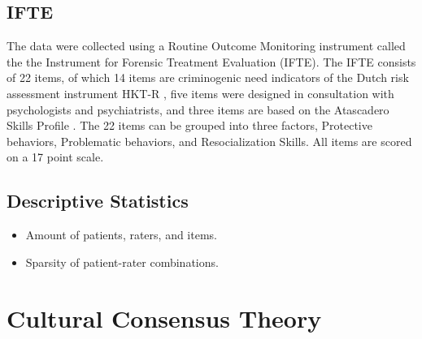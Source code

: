 \documentclass[a4paper,11pt]{article}
\begin{document}
\subsection{IFTE}

The data were collected using a Routine Outcome Monitoring instrument called the the Instrument for Forensic Treatment Evaluation (IFTE).
The IFTE consists of 22 items, of which 14 items are criminogenic need indicators of the Dutch risk assessment instrument HKT-R \parencite{spreen2013handleiding}, five items were designed in consultation with psychologists and psychiatrists, and three items are based on the Atascadero Skills Profile \parencite{vess2001development}.
The 22 items can be grouped into three factors, Protective behaviors, Problematic behaviors, and Resocialization Skills.
All items are scored on a 17 point scale.



\subsection{Descriptive Statistics}
\begin{itemize}
	\item Amount of patients, raters, and items.
	\item Sparsity of patient-rater combinations.
\end{itemize}


\section{Cultural Consensus Theory}
\end{document}
